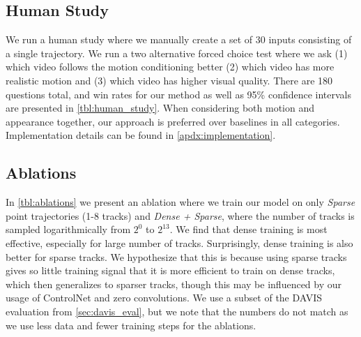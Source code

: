 

\subsection{Human Study}

We run a human study where we manually create a set of 30 inputs consisting of a single trajectory.
We run a two alternative forced choice test where we ask (1) which video follows the motion conditioning better (2) which video has more realistic motion and (3) which video has higher visual quality. There are 180 questions total, and win rates for our method as well as 95\% confidence intervals are presented in \cref{tbl:human_study}.
When considering both motion and appearance together, our approach is preferred over baselines in all categories. Implementation details can be found in \cref{apdx:implementation}.


\subsection{Ablations}

In \cref{tbl:ablations} we present an ablation where we train our model on only {\it Sparse} point trajectories (1-8 tracks) and {\it Dense + Sparse}, where the number of tracks is sampled logarithmically from $2^0$ to $2^{13}$. 
We find that dense training is most effective, especially for large number of tracks. Surprisingly, dense training is also better for sparse tracks. We hypothesize that this is because using sparse tracks gives so little training signal that it is more efficient to train on dense tracks, which then generalizes to sparser tracks, though this may be influenced by our usage of ControlNet and zero convolutions. We use a subset of the DAVIS evaluation from \cref{sec:davis_eval}, but we note that the numbers do not match as we use less data and fewer training steps for the ablations.








